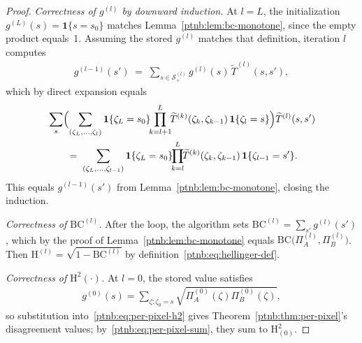\begin{proof}
\emph{Correctness of $g^{(l)}$ by downward induction.} At $l=L$, the initialization
$g^{(L)}(s)=\mathbf{1}\{s=s_0\}$ matches Lemma~\ref{ptnb:lem:bc-monotone}, since the
empty product equals~1. Assuming the stored $g^{(l)}$ matches that definition,
iteration $l$ computes
\begin{align}
    g^{(l-1)}(s') \;=\; \sum_{s \in \mathcal{S}^{(l)}_+} g^{(l)}(s)\, \widetilde{T}^{(l)}(s, s'),
\end{align}
which by direct expansion equals
\begin{align}
    \begin{aligned}
        &\sum_s \Bigl(\sum_{(\zeta_L,\ldots,\zeta_l)} \mathbf{1}\{\zeta_L =
        s_0\}\!\!\prod_{k=l+1}^L\!\!\widetilde{T}^{(k)}(\zeta_k, \zeta_{k-1})\, \mathbf{1}\{\zeta_l =
        s\}\Bigr) \widetilde{T}^{(l)}(s, s') \\
        &\qquad=\; \sum_{(\zeta_L, \ldots, \zeta_{l-1})} \mathbf{1}\{\zeta_L =
        s_0\}\!\!\prod_{k=l}^L\!\!\widetilde{T}^{(k)}(\zeta_k, \zeta_{k-1})\, \mathbf{1}\{\zeta_{l-1} =
        s'\}.
    \end{aligned}
\end{align}
This equals $g^{(l-1)}(s')$ from Lemma~\ref{ptnb:lem:bc-monotone}, closing the induction.

\emph{Correctness of $\mathrm{BC}^{(l)}$.}  After the loop, the algorithm sets $\mathrm{BC}^{(l)} =
    \sum_{s'} g^{(l)}(s')$, which by the proof of Lemma~\ref{ptnb:lem:bc-monotone} equals
$\mathrm{BC}\!\bigl(\Pi^{(l)}_A, \Pi^{(l)}_B\bigr)$.  Then $\mathrm{H}^{(l)} = \sqrt{1 -
    \mathrm{BC}^{(l)}}$ by definition~\eqref{ptnb:eq:hellinger-def}.

\emph{Correctness of $\mathrm{H}^2(\cdot)$.} At $l = 0$, the stored value satisfies
\begin{align}
    g^{(0)}(s)
    =
    \sum_{\zeta: \zeta_0 = s}
    \sqrt{\Pi^{(0)}_A(\zeta) \Pi^{(0)}_B(\zeta)},
\end{align}
so substitution into~\eqref{ptnb:eq:per-pixel-h2} gives Theorem~\ref{ptnb:thm:per-pixel}'s
disagreement values; by~\eqref{ptnb:eq:per-pixel-sum}, they sum to $\mathrm{H}^{2}_{(0)}$.
\end{proof}

